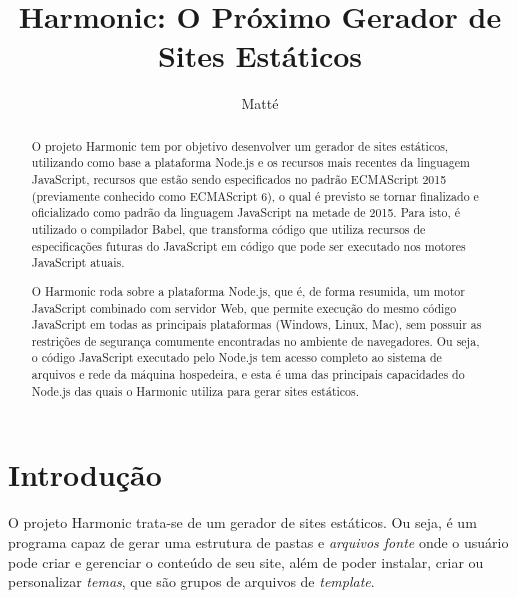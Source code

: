 \documentclass[ppginf, pep]{esinucpel}
\title{Harmonic: O Próximo Gerador de Sites Estáticos}
\author{Matté}{Fabrício da Silva}
\begin{document}

\maketitle
\sloppy


\tableofcontents

\begin{abstract}

O projeto Harmonic tem por objetivo desenvolver um gerador de sites estáticos, utilizando como base a plataforma Node.js e os recursos mais recentes da linguagem JavaScript, recursos que estão sendo especificados no padrão ECMAScript 2015 (previamente conhecido como ECMAScript 6), o qual é previsto se tornar finalizado e oficializado como padrão da linguagem JavaScript na metade de 2015. Para isto, é utilizado o compilador Babel, que transforma código que utiliza recursos de especificações futuras do JavaScript em código que pode ser executado nos motores JavaScript atuais.

O Harmonic roda sobre a plataforma Node.js, que é, de forma resumida, um motor JavaScript combinado com servidor Web, que permite execução do mesmo código JavaScript em todas as principais plataformas (Windows, Linux, Mac), sem possuir as restrições de segurança comumente encontradas no ambiente de navegadores. Ou seja, o código JavaScript executado pelo Node.js tem acesso completo ao sistema de arquivos e rede da máquina hospedeira, e esta é uma das principais capacidades do Node.js das quais o Harmonic utiliza para gerar sites estáticos.


\end{abstract}

\chapter{Introdução}

O projeto Harmonic trata-se de um gerador de sites estáticos. Ou seja, é um programa capaz de gerar uma estrutura de pastas e \emph{arquivos fonte} onde o usuário pode criar e gerenciar o conteúdo de seu site, além de poder instalar, criar ou personalizar \emph{temas}, que são grupos de arquivos de \textit{template}.
\end{document}
